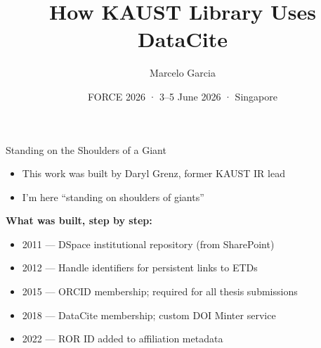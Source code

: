 \documentclass[aspectratio=169]{beamer}
\title{How KAUST Library Uses DataCite}
\author{Marcelo Garcia}
\institute{KAUST University Library}
\date{FORCE 2026 · 3--5 June 2026 · Singapore}
\begin{document}
\frame{\titlepage}

\begin{frame}{Standing on the Shoulders of a Giant}
\begin{itemize}
    \item This work was built by Daryl Grenz, former KAUST IR lead
    \item I'm here ``standing on shoulders of giants''
\end{itemize}
\vspace{0.8em}
\textbf{What was built, step by step:}
\begin{itemize}
    \item 2011 — DSpace institutional repository (from SharePoint)
    \item 2012 — Handle identifiers for persistent links to ETDs
    \item 2015 — ORCID membership; required for all thesis submissions
    \item 2018 — DataCite membership; custom DOI Minter service
    \item 2022 — ROR ID added to affiliation metadata
\end{itemize}
\end{frame}
\end{document}
